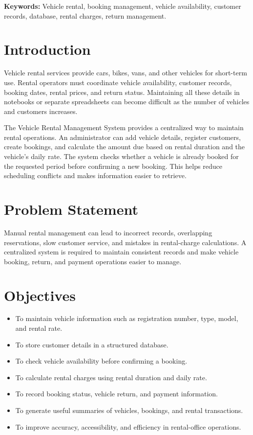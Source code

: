 \documentclass[11pt,a4paper]{report}
\begin{document}
\textbf{Keywords:} Vehicle rental, booking management, vehicle availability, customer records, database, rental charges, return management.

\newpage
\section{Introduction}
Vehicle rental services provide cars, bikes, vans, and other vehicles for short-term use. Rental operators must coordinate vehicle availability, customer records, booking dates, rental prices, and return status. Maintaining all these details in notebooks or separate spreadsheets can become difficult as the number of vehicles and customers increases.

The Vehicle Rental Management System provides a centralized way to maintain rental operations. An administrator can add vehicle details, register customers, create bookings, and calculate the amount due based on rental duration and the vehicle's daily rate. The system checks whether a vehicle is already booked for the requested period before confirming a new booking. This helps reduce scheduling conflicts and makes information easier to retrieve.

\section{Problem Statement}
Manual rental management can lead to incorrect records, overlapping reservations, slow customer service, and mistakes in rental-charge calculations. A centralized system is required to maintain consistent records and make vehicle booking, return, and payment operations easier to manage.

\section{Objectives}
\begin{itemize}
\item To maintain vehicle information such as registration number, type, model, and rental rate.
\item To store customer details in a structured database.
\item To check vehicle availability before confirming a booking.
\item To calculate rental charges using rental duration and daily rate.
\item To record booking status, vehicle return, and payment information.
\item To generate useful summaries of vehicles, bookings, and rental transactions.
\item To improve accuracy, accessibility, and efficiency in rental-office operations.
\end{itemize}
\end{document}
